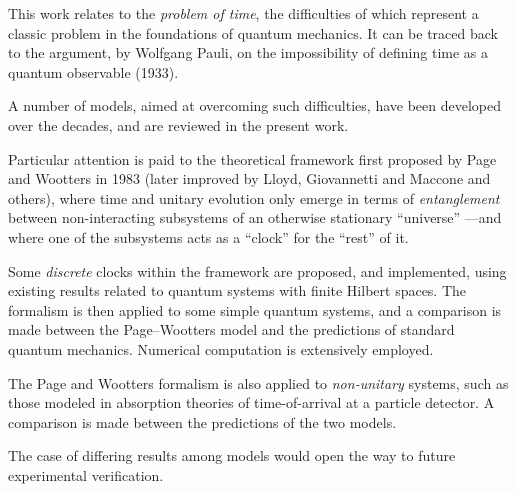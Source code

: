 This work relates to the
\emph{problem of time},
the difficulties of which
represent a classic problem in the foundations of quantum mechanics.
It can be traced back to
the argument, by Wolfgang Pauli,
on the impossibility of defining time as a quantum observable (1933).

A number of models, aimed at overcoming such difficulties,
have been developed over the decades,
and are reviewed in the present work.

Particular attention is paid to 
the theoretical framework first proposed by Page and Wootters in 1983
(later improved by Lloyd, Giovannetti and Maccone and others),
where time and unitary evolution only emerge in
terms of \emph{entanglement} between non-interacting subsystems
of an otherwise stationary ``universe''
---and where one of the subsystems acts as a ``clock'' for the ``rest'' of it.


Some \emph{discrete} clocks within the framework are proposed, and implemented,
using
existing results related to quantum systems with finite Hilbert spaces.
The formalism is then applied to some simple quantum systems,
and a comparison is made between the Page--Wootters model and the predictions
of standard quantum mechanics. 
Numerical computation is extensively employed.

The Page and Wootters formalism is also applied to \emph{non-unitary} systems,
such as those modeled in absorption theories of time-of-arrival at a particle detector.
A comparison is made between the predictions of the two models.

The case of differing results among models would open the way to future experimental verification.